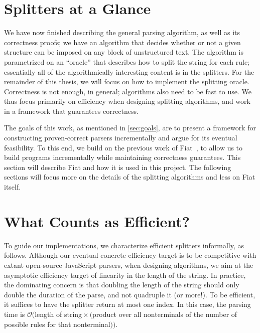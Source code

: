 \section{Splitters at a Glance}
  We have now finished describing the general parsing algorithm, as well as its correctness proofs; we have an algorithm that decides whether or not a given structure can be imposed on any block of unstructured text.  The algorithm is parametrized on an ``oracle'' that describes how to split the string for each rule; essentially all of the algorithmically interesting content is in the splitters.  For the remainder of this thesis, we will focus on how to implement the splitting oracle.  Correctness is not enough, in general; algorithms also need to be fast to use.  We thus focus primarily on efficiency when designing splitting algorithms, and work in a framework that guarantees correctness.
  
  The goals of this work, as mentioned in \autoref{sec:goals}, are to present a framework for constructing proven-correct parsers incrementally and argue for its eventual feasibility.  To this end, we build on the previous work of Fiat~\cite{fiat}, to allow us to build programs incrementally while maintaining correctness guarantees.  This section will describe Fiat and how it is used in this project.  The following sections will focus more on the details of the splitting algorithms and less on Fiat itself.
  
\section{What Counts as Efficient?}
  To guide our implementations, we characterize efficient splitters informally, as follows.  Although our eventual concrete efficiency target is to be competitive with extant open-source JavaScript parsers, when designing algorithms, we aim at the asymptotic efficiency target of linearity in the length of the string.  In practice, the dominating concern is that doubling the length of the string should only double the duration of the parse, and not quadruple it (or more!).  %
  To be efficient, it suffices to have the splitter return at most one index.  In this case, the parsing time is $\mathcal O($length of string${} \times ($product over all nonterminals of the number of possible rules for that nonterminal$))$.
    

